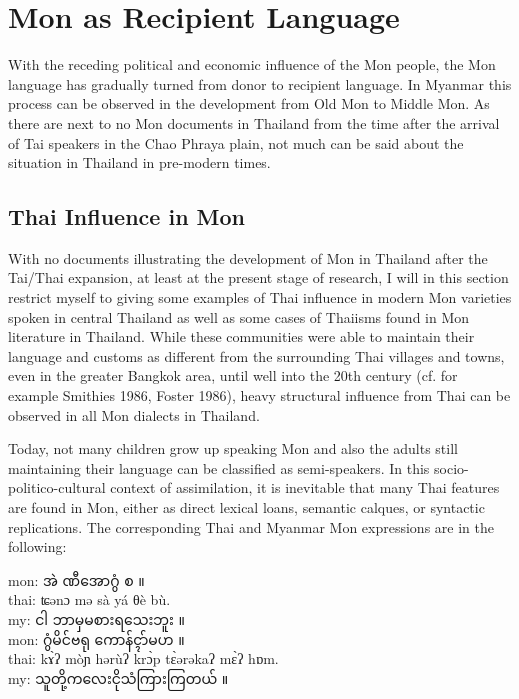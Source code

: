 \documentclass[conference]{IEEEtran}
\begin{document}
\section{Mon as Recipient Language}
\label{sec:Mon as recipient language}
With the receding political and economic influence of the Mon people, the Mon language has gradually turned from donor to recipient language. In Myanmar this process can be observed in the development from Old Mon to Middle Mon. As there are next to no Mon documents in Thailand from the time after the arrival of Tai speakers in the Chao Phraya plain, not much can be said about the situation in Thailand in pre-modern times.

\subsection{Thai Influence in Mon}
With no documents illustrating the development of Mon in Thailand after the Tai/Thai expansion, at least at the present stage of research, I will in this section restrict myself to giving some examples of Thai influence in modern Mon varieties spoken in central Thailand as well as some cases of Thaiisms found in Mon literature in Thailand. While these communities were able to maintain their language and customs as different from the surrounding Thai villages and towns, even in the greater Bangkok area, until well into the 20th century (cf. for example Smithies 1986, Foster 1986), heavy structural influence from Thai can be observed in all Mon dialects in Thailand.
\par Today, not many children grow up speaking Mon and also the adults still maintaining their language can be classified as semi-speakers. In this socio-politico-cultural context of assimilation, it is inevitable that many Thai features are found in Mon, either as direct lexical loans, semantic calques, or syntactic replications. The corresponding Thai and Myanmar Mon expressions are in the following: \cite{b9}

\noindent mon: {\padauktext အဲ ဏီအောဂွံ စ ။}\\
thai:  ʨənɔ mə sà yá θè bù.\\
my: {\padauktext ငါ ဘာမှမစားရသေးဘူး ။}\\

\noindent mon: {\padauktext ဂွံမိင်ဗရု ကောန်ၚာ်မဟ ။}\\
thai:  kɤ̀ʔ mòɲ hərùʔ krɔ̀p tɛ̀ərəkaʔ mɛ̀ʔ hɒm.\\
my: {\padauktext သူတို့ကလေးငိုသံကြားကြတယ် ။}\\
\end{document}

